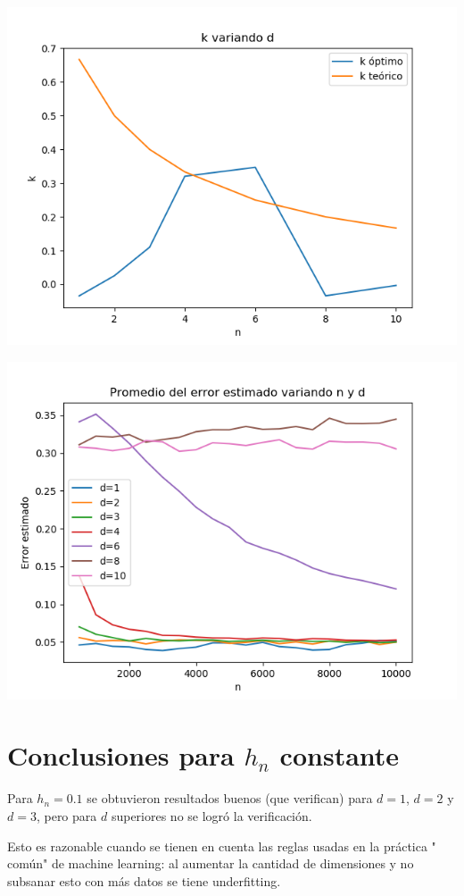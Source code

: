 \documentclass[12pt, a4paper]{article}
\begin{document}
\includegraphics[width=\textwidth]{figuras_h=0.5/k-variando-d}

\includegraphics[width=\textwidth]{figuras_h=0.5/resultados-grales}

\section{Conclusiones para $h_n$ constante}
Para $h_n=0.1$ se obtuvieron resultados buenos (que verifican) para $d=1$, $d=2$ y $d=3$, pero para $d$ superiores no se logró la verificación. 

Esto es razonable cuando se tienen en cuenta las reglas usadas en la práctica " común" de machine learning: al aumentar la cantidad de dimensiones y no subsanar esto con más datos se tiene underfitting. 
\end{document}
